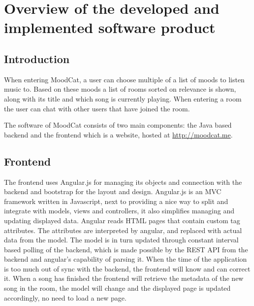 \chapter{Overview of the developed and implemented software product}

\section{Introduction}
When entering MoodCat, a user can choose multiple of a list of moods to listen music to. Based on these moods a list of rooms
sorted on relevance is shown, along with its title and which song is currently playing. When entering a room
the user can chat with other users that have joined the room.

The software of MoodCat consists of two main components: the Java based backend and the frontend which is a website,
hosted at \url{http://moodcat.me}.

\section{Frontend}
The frontend uses Angular.js for managing its objects and connection with the backend and bootstrap
for the layout and design.
Angular.js is an MVC framework written in Javascript, next to providing a nice way to split
and integrate with models, views and controllers, it also simplifies managing and updating displayed data.
Angular reads HTML pages that contain custom tag attributes. The attributes are interpreted by angular, and
replaced with actual data from the model.
The model is in turn updated through constant interval based polling of the backend, which is made possible by the REST API from the backend
and angular's capability of parsing it. When the time of the application is too much out of sync with the backend,
the frontend will know and can correct it. When a song has finished the frontend will retrieve the metadata of the new song in the room, the model
will change and the displayed page is updated accordingly, no need to load a new page.

